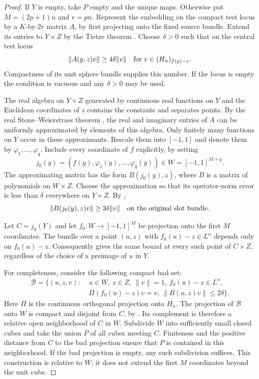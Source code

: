 \begin{proof}
If $Y$ is empty, take $P$ empty and the unique maps.  Otherwise put
$M=(2p+1)n$ and $r=pn$.
Represent the embedding on the compact test locus by a
$K$-by-$2r$ matrix $A$, by first projecting onto the fixed source
bundle.  Extend its entries to $Y\times Z$ by the Tietze theorem
\cite[Theorem~1.10.5]{Tao2010}.
Choose $\delta>0$ such that on the central test locus
\begin{equation}
 \label{eq:original-injectivity}
 \|A(y,z)v\|\ge4\delta\|v\|
 \quad\hbox{for }v\in(H_n)_{f(y)-z}.
\end{equation}
Compactness of its unit sphere bundle supplies this number.  If
the locus is empty the condition is vacuous and any $\delta>0$
may be used.

The real algebra on $Y\times Z$ generated by continuous real
functions on $Y$ and the Euclidean coordinates of $z$ contains the
constants and separates points.  By the real Stone--Weierstrass theorem
\cite[Theorem~1.10.18]{Tao2010},
the real and imaginary entries of $A$ can be uniformly approximated
by elements of this algebra.  Only finitely many functions on $Y$
occur in these approximants.  Rescale them into $[-1,1]$ and denote
them by $\varphi_1,\ldots,\varphi_q$.  Include every coordinate of
$f$ explicitly, by setting
\[
 j_0(y)=(f(y),\varphi_1(y),\ldots,\varphi_q(y))
       \in W=[-1,1]^{M+q}.
\]
The approximating matrix has the form $B(j_0(y),z)$, where $B$ is
a matrix of polynomials on $W\times Z$.  Choose the approximation
so that its operator-norm error is less than $\delta$ everywhere
on $Y\times Z$.  By ,
\begin{equation}
 \label{eq:coordinate-injectivity}
 \|B(j_0(y),z)v\|\ge3\delta\|v\|
 \quad\hbox{on the original slot bundle}.
\end{equation}

Let $C=j_0(Y)$ and let $f_0:W\to[-1,1]^M$ be projection onto the
first $M$ coordinates.  The bundle over a point $(u,z)$ with
$f_0(u)-z\in L^n$ depends only on $f_0(u)-z$.  Consequently
 gives the same bound at every
such point of $C\times Z$, regardless of the choice of a preimage
of $u$ in $Y$.

For completeness, consider the following compact bad set:
\[
 \begin{split}
 \mathcal B=\{(u,z,v):\;&u\in W,\ z\in Z,\ \|v\|=1,
               \ f_0(u)-z\in L^n,\\
              &\Pi(f_0(u)-z)v=v,
               \ \|B(u,z)v\|\le2\delta\}.
 \end{split}
\]
Here $\Pi$ is the continuous orthogonal projection onto $H_n$.
The projection of $\mathcal B$ onto $W$ is compact and disjoint
from $C$, by .  Its complement
is therefore a relative open neighborhood of $C$ in $W$.
Subdivide $W$ into sufficiently small closed cubes and take the
union $P$ of all cubes meeting $C$.  Finiteness and the positive
distance from $C$ to the bad projection ensure that $P$ is contained
in this neighborhood.  If the bad projection is empty, any such
subdivision suffices.  This construction is relative to $W$; it
does not extend the first $M$ coordinates beyond the unit cube.


\end{proof}
